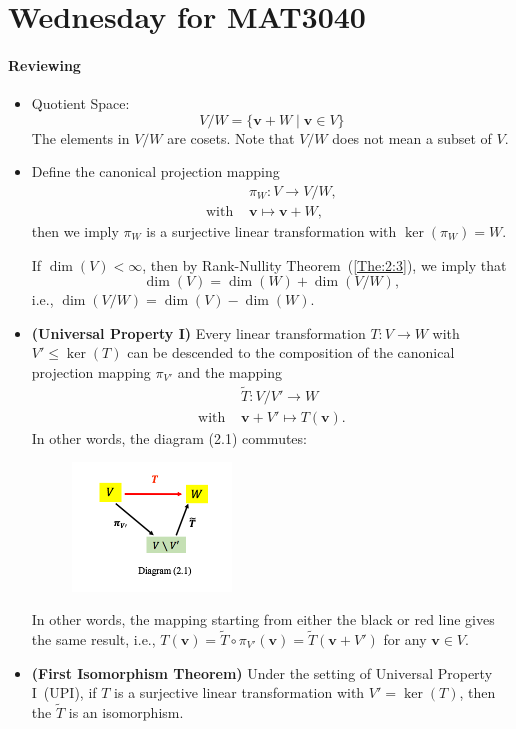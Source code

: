 
\section{Wednesday for MAT3040}
\paragraph{Reviewing}
\begin{itemize}
\item
Quotient Space:
\[
V/ W=\{\bm v+W\mid \bm v\in V\}
\]
The elements in $V/ W$ are cosets.
Note that $V/ W$ does not mean a subset of $V$.
\item
Define the canonical projection mapping
\[
\begin{array}{ll}
&\pi_W:V\to V/ W,\\
\text{with }&\bm v\mapsto \bm v+W,
\end{array}
\]
then we imply $\pi_W$ is a surjective linear transformation with $\ker(\pi_W)=W$. 

If $\dim(V)<\infty$, then by Rank-Nullity Theorem~(\ref{The:2:3}), we imply that 
\[
\dim(V)=\dim(W) + \dim(V/ W),
\]
i.e., $\dim(V/ W) = \dim(V) - \dim(W).$
\item
\textbf{(Universal Property I)} Every linear transformation $T:V\to W$ with $V'\le\ker(T)$ can be descended to the composition of the canonical projection mapping $\pi_{V'}$ and the mapping
\[
\begin{array}{ll}
&\tilde{T}:V/ V'\to W\\
\text{with }&\bm v+V'\mapsto T(\bm v).
\end{array}
\]
In other words, the diagram (2.1) commutes:
\begin{figure}[H]
\centering
\includegraphics[width=0.4\textwidth]{week4/p_2}
\end{figure}
In other words, the mapping starting from either the black or red line gives the same result, i.e., $T(\bm v) = \tilde{T}\circ \pi_{V'}(\bm v) = \tilde{T}(\bm v+V')$ for any $\bm v\in V$. 
\item
\textbf{(First Isomorphism Theorem)}
Under the setting of Universal Property I~(UPI), if $T$ is a surjective linear transformation with $V'=\ker(T)$, then the $\tilde{T}$ is an isomorphism.
\end{itemize}

